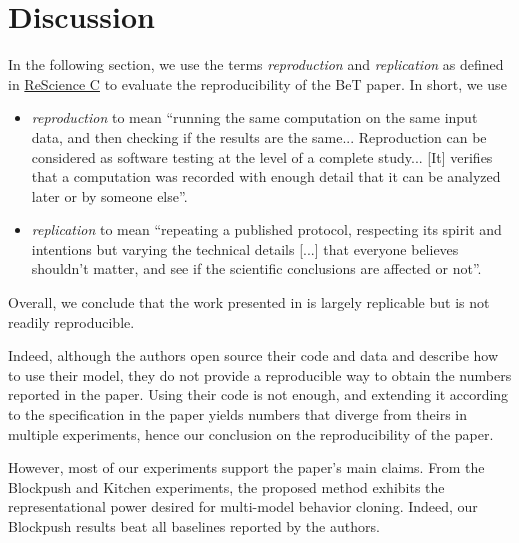 \section{Discussion}\label{sec:discussion}

In the following section, we use the terms \textit{reproduction} and \textit{replication} as defined in \href{http://rescience.github.io/faq/#whats-the-difference-between-replication-and-reproduction}{ReScience C} to evaluate the reproducibility of the BeT paper.
In short, we use
\begin{itemize}
    \item \textit{reproduction} to mean ``running the same computation on the same input data, and then checking if the results are the same...
    Reproduction can be considered as software testing at the level of a complete study...
    [It] verifies that a computation was recorded with enough detail that it can be analyzed later or by someone else''.\label{def:reproduction}
    \item \textit{replication} to mean ``repeating a published protocol, respecting its spirit and intentions but varying the technical details [...] that everyone believes shouldn’t matter, and see if the scientific conclusions are affected or not''.
    \label{def:replication}
\end{itemize}

Overall, we conclude that the work presented in  is largely replicable but is not readily reproducible.

Indeed, although the authors open source their code and data and describe how to use their model, they do not provide a reproducible way to obtain the numbers reported in the paper.
Using their code is not enough, and extending it according to the specification in the paper yields numbers that diverge from theirs in multiple experiments, hence our conclusion on the reproducibility of the paper.

However, most of our experiments support the paper's main claims.
From the Blockpush and Kitchen experiments, the proposed method exhibits the representational power desired for multi-model behavior cloning.
Indeed, our Blockpush results beat all baselines reported by the authors.

